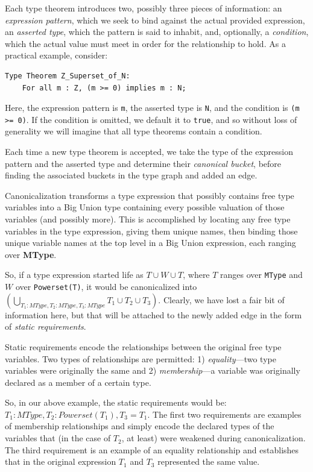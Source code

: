 Each type theorem introduces two, possibly three pieces of information: an \emph{expression pattern}, which we seek to bind against the actual provided expression, an \emph{asserted type}, which the pattern is said to inhabit, and, optionally, a \emph{condition}, which the actual value must meet in order for the relationship to hold.  As a practical example, consider:

\begin{lstlisting}
Type Theorem Z_Superset_of_N:
	For all m : Z, (m >= 0) implies m : N;
\end{lstlisting}

Here, the expression pattern is \texttt{m}, the asserted type is \texttt{N}, and the condition is \texttt{(m >= 0)}.  If the condition is omitted, we default it to \texttt{true}, and so without loss of generality we will imagine that all type theorems contain a condition.

Each time a new type theorem is accepted, we take the type of the expression pattern and the asserted type and determine their \emph{canonical bucket}, before finding the associated buckets in the type graph and added an edge.

Canonicalization transforms a type expression that possibly contains free type variables into a Big Union type containing every possible valuation of those variables (and possibly more).  This is accomplished by locating any free type variables in the type expression, giving them unique names, then binding those unique variable names at the top level in a Big Union expression, each ranging over \textbf{MType}.

So, if a type expression started life as $T \cup W \cup T$, where $T$ ranges over \texttt{MType} and $W$ over \texttt{Powerset(T)}, it would be canonicalized into $\left( \bigcup \limits_{T_1 : MType, T_2 : MType, T_3 : MType} T_1 \cup T_2 \cup T_3 \right)$.  Clearly, we have lost a fair bit of information here, but that will be attached to the newly added edge in the form of \emph{static requirements}.

Static requirements encode the relationships between the original free type variables.  Two types of relationships are permitted: 1) \emph{equality}---two type variables were originally the same and 2) \emph{membership}---a variable was originally declared as a member of a certain type.

So, in our above example, the static requirements would be: $T_1 : MType, T_2 : Powerset(T_1), T_3 = T_1$.  The first two requirements are examples of membership relationships and simply encode the declared types of the variables that (in the case of $T_2$, at least) were weakened during canonicalization.  The third requirement is an example of an equality relationship and establishes that in the original expression $T_1$ and $T_3$ represented the same value.

